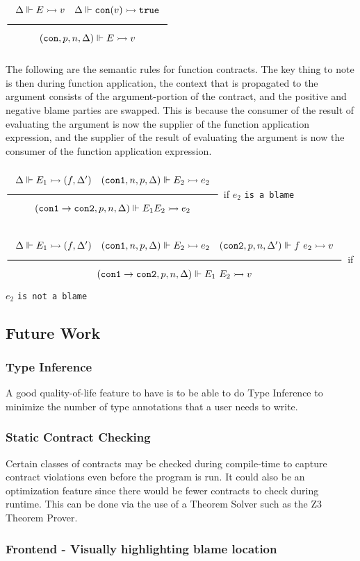 \documentclass[a4paper]{article}
\newcommand{\Rule}[2]{\genfrac{}{}{0.7pt}{}{{\setlength{\fboxrule}{0pt}\setlength{\fboxsep}{3mm}\fbox{$#1$}}}{{\setlength{\fboxrule}{0pt}\setlength{\fboxsep}{3mm}\fbox{$#2$}}}}
\newcommand{\TruE}{\texttt{true}}
\newcommand{\eval}{\rightarrowtail}
\newcommand{\under}{\Vdash}
\newcommand{\flatCon}{\texttt{con}}
\newcommand{\funCon}{\texttt{con1} \rightarrow \texttt{con2}}
\newcommand{\conA}{\texttt{con1}}
\newcommand{\conB}{\texttt{con2}}
\begin{document}
$\Rule{\Delta \under E \eval v \quad \Delta \under \flatCon(v) \eval \TruE}
{(\flatCon, p, n, \Delta) \under E \eval v}$

The following are the semantic rules for function contracts. The key thing to note is then during
function application, the context that is propagated to the argument consists of the argument-portion of the contract,
and the positive and negative blame parties are swapped. This is because the consumer of the result of evaluating the argument
is now the supplier of the function application expression, and the supplier of the result of evaluating the argument
is now the consumer of the function application expression.

$\Rule{\Delta \under E_1 \eval (f, \Delta') \quad (\conA, n, p, \Delta) \under E_2 \eval e_2}
{(\funCon, p, n, \Delta) \under E_1 E_2 \eval e_2}$ if $e_2$ \texttt{is a blame}

$\Rule{\Delta \under E_1 \eval (f, \Delta') \quad (\conA, n, p, \Delta) \under E_2 \eval e_2 \quad (\conB, p, n, \Delta') \under f\ e_2 \eval v }
{(\funCon, p, n, \Delta) \under E_1\ E_2 \eval v}$ if $e_2$ \texttt{is not a blame}

\subsection{Future Work}

\subsubsection{Type Inference}

A good quality-of-life feature to have is to be able to do Type Inference to minimize the number of
type annotations that a user needs to write.

\subsubsection{Static Contract Checking}

Certain classes of contracts may be checked during compile-time to capture contract violations
even before the program is run. It could also be an optimization feature since there would be fewer
contracts to check during runtime. This can be done via the use of a Theorem Solver such as the Z3 Theorem Prover.

\subsubsection{Frontend - Visually highlighting blame location}
\end{document}
